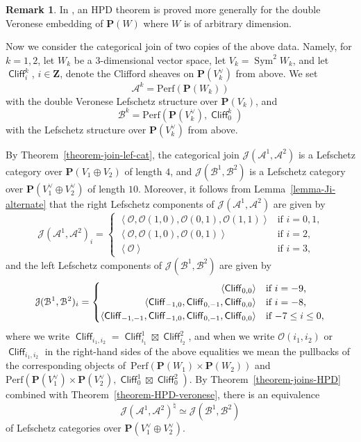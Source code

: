 \documentclass[11pt, reqno]{amsart}
\numberwithin{equation}{section}
\theoremstyle{plain}
\theoremstyle{definition}
\newtheorem{remark}[theorem]{Remark}
\newcommand{\Perf}{\mathrm{Perf}}
\newcommand{\hpd}{{\natural}}
\newcommand{\svee}{\scriptscriptstyle\vee}
\newcommand{\llangle}{\left \langle}
\newcommand{\rrangle}{\right \rangle}
\DeclareMathOperator{\Sym}{Sym}
\DeclareMathOperator{\Cl}{\mathsf{Cliff}}
\newcommand{\vV}{V^{\svee}}
\newcommand{\cO}{\mathcal{O}}
\newcommand{\cA}{\mathcal{A}}
\newcommand{\cB}{\mathcal{B}}
\newcommand{\cJ}{\mathcal{J}}
\newcommand{\bZ}{\mathbf{Z}}
\newcommand{\bP}{\mathbf{P}}
\begin{document}
\begin{remark}
In \cite{kuznetsov08quadrics}, an HPD theorem is proved more generally for the double Veronese 
embedding of $\bP(W)$ where $W$ is of arbitrary dimension. 
\end{remark}

Now we consider the categorical join of two copies of the above data. 
Namely, for $k=1,2$, let $W_k$ be a $3$-dimensional vector space,  
let $V_k = \Sym^2 W_k$, and let $\Cl^k_i$, $i \in \bZ$, denote the Clifford sheaves on $\bP(\vV_k)$ from above.  
We set 
\begin{equation*}
\cA^k = \Perf(\bP(W_k))
\end{equation*} 
with the double Veronese Lefschetz structure over $\bP(V_k)$, and 
\begin{equation*}
\cB^k = \Perf(\bP(\vV_k), \Cl^k_0) 
\end{equation*}
with the Lefschetz structure over $\bP(\vV_k)$ from above. 

By Theorem~\ref{theorem-join-lef-cat}, 
the categorical join $\cJ(\cA^1, \cA^2)$ is a Lefschetz category over $\bP(V_1 \oplus V_2)$ of length $4$, 
and $\cJ(\cB^1, \cB^2)$ is a Lefschetz category over $\bP(\vV_1 \oplus \vV_2)$ 
of length $10$. 
Moreover, it follows from Lemma~\ref{lemma-Ji-alternate} that the right Lefschetz components 
of $\cJ(\cA^1, \cA^2)$ are given by 
\begin{equation*}
\cJ(\cA^1, \cA^2)_{i}  =  
\begin{cases}
\llangle \cO, \cO(1,0), \cO(0,1), \cO(1,1) \rrangle  & \text{if $i = 0, 1$,} \\ 
\llangle \cO, \cO(1,0), \cO(0,1) \rrangle  & \text{if $i = 2$,} \\ 
\llangle \cO \rrangle  & \text{if $i = 3$,} 
\end{cases} 
\end{equation*} 
and the left Lefschetz components of $\cJ(\cB^1, \cB^2)$ are given by 
\begin{equation*}
\cJ(\cB^1, \cB^2)_{i} = 
\begin{cases}
\hphantom{\Cl_{-1,-1}, \Cl_{-1,0}, \Cl_{0,-1},} \llangle \Cl_{0,0}  \rrangle  & \text{if $i = -9$,} \\
\hphantom{\Cl_{-1,-1},} \llangle \Cl_{-1,0}, \Cl_{0,-1}, \Cl_{0,0} \rrangle  & \text{if $i = -8$,} \\ 
\llangle \Cl_{-1,-1}, \Cl_{-1,0}, \Cl_{0,-1}, \Cl_{0,0} \rrangle  & \text{if $-7 \leq i \leq 0$,} 
\end{cases}
\end{equation*}
where we write $\Cl_{i_1,i_2} = \Cl^1_{i_1} \boxtimes \Cl^2_{i_2}$,
and when we write $\cO(i_1,i_2)$ or $\Cl_{i_1,i_2}$ in the right-hand sides of the above equalities we mean
the pullbacks of the corresponding 
objects of~$\Perf(\bP(W_1) \times \bP(W_2))$ and~$\Perf(\bP(\vV_1) \times \bP(\vV_2), \Cl^1_0 \boxtimes \Cl^2_0)$. 
By Theorem~\ref{theorem-joins-HPD} combined with Theorem~\ref{theorem-HPD-veronese}, 
there is an equivalence 
\begin{equation*}
\cJ(\cA^1, \cA^2)^{\hpd} \simeq \cJ(\cB^1, \cB^2)
\end{equation*}
of Lefschetz categories over $\bP(\vV_1 \oplus \vV_2)$. 
\end{document}

